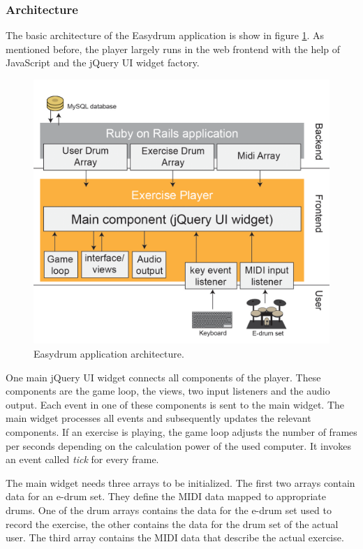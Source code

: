 \subsubsection{Architecture}

The basic architecture of the Easydrum application is show in figure \ref{fig:Easydrumarchitecture}. As mentioned before, the player largely runs in the web frontend with the help of JavaScript and the jQuery UI widget factory. 

\begin{figure}[ht]
	\centering
	\includegraphics[width=.8\textwidth]{images/Easydrum/app_architcture.png}
	\caption{Easydrum application architecture.}
	\label{fig:Easydrumarchitecture}
\end{figure}

One main jQuery UI widget connects all components of the player. These components are the game loop, the views, two input listeners and the audio output. Each event in one of these components is sent to the main widget. The main widget processes all events and subsequently updates the relevant components. If an exercise is playing, the game loop adjusts the number of frames per seconds depending on the calculation power of the used computer. It invokes an event called \textit{tick} for every frame.

The main widget needs three arrays to be initialized. The first two arrays contain data for an e-drum set. They define the MIDI data mapped to appropriate drums. One of the drum arrays contains the data for the e-drum set used to record the exercise, the other contains the data for the drum set of the actual user. The third array contains the MIDI data that describe the actual exercise.

